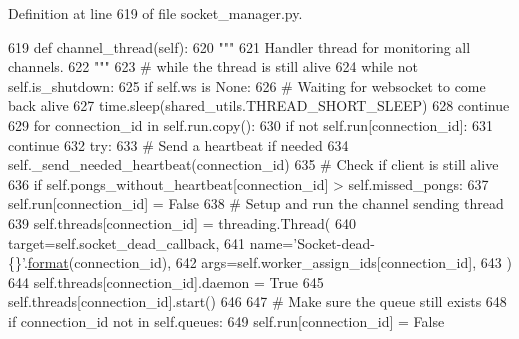 Definition at line 619 of file socket\+\_\+manager.\+py.


\begin{DoxyCode}
619     \textcolor{keyword}{def }channel\_thread(self):
620         \textcolor{stringliteral}{"""}
621 \textcolor{stringliteral}{        Handler thread for monitoring all channels.}
622 \textcolor{stringliteral}{        """}
623         \textcolor{comment}{# while the thread is still alive}
624         \textcolor{keywordflow}{while} \textcolor{keywordflow}{not} self.is\_shutdown:
625             \textcolor{keywordflow}{if} self.ws \textcolor{keywordflow}{is} \textcolor{keywordtype}{None}:
626                 \textcolor{comment}{# Waiting for websocket to come back alive}
627                 time.sleep(shared\_utils.THREAD\_SHORT\_SLEEP)
628                 \textcolor{keywordflow}{continue}
629             \textcolor{keywordflow}{for} connection\_id \textcolor{keywordflow}{in} self.run.copy():
630                 \textcolor{keywordflow}{if} \textcolor{keywordflow}{not} self.run[connection\_id]:
631                     \textcolor{keywordflow}{continue}
632                 \textcolor{keywordflow}{try}:
633                     \textcolor{comment}{# Send a heartbeat if needed}
634                     self.\_send\_needed\_heartbeat(connection\_id)
635                     \textcolor{comment}{# Check if client is still alive}
636                     \textcolor{keywordflow}{if} self.pongs\_without\_heartbeat[connection\_id] > self.missed\_pongs:
637                         self.run[connection\_id] = \textcolor{keyword}{False}
638                         \textcolor{comment}{# Setup and run the channel sending thread}
639                         self.threads[connection\_id] = threading.Thread(
640                             target=self.socket\_dead\_callback,
641                             name=\textcolor{stringliteral}{'Socket-dead-\{\}'}.\hyperlink{namespaceparlai_1_1chat__service_1_1services_1_1messenger_1_1shared__utils_a32e2e2022b824fbaf80c747160b52a76}{format}(connection\_id),
642                             args=self.worker\_assign\_ids[connection\_id],
643                         )
644                         self.threads[connection\_id].daemon = \textcolor{keyword}{True}
645                         self.threads[connection\_id].start()
646 
647                     \textcolor{comment}{# Make sure the queue still exists}
648                     \textcolor{keywordflow}{if} connection\_id \textcolor{keywordflow}{not} \textcolor{keywordflow}{in} self.queues:
649                         self.run[connection\_id] = \textcolor{keyword}{False}

\end{DoxyCode}
